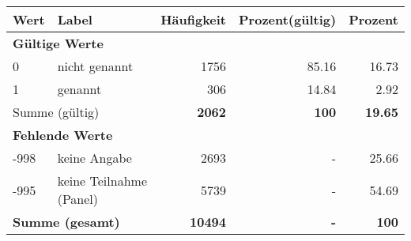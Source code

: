      \begin{longtable}{lXrrr}
     \toprule
     \textbf{Wert} & \textbf{Label} & \textbf{Häufigkeit} & \textbf{Prozent(gültig)} & \textbf{Prozent} \\
     \endhead
     \midrule
     \multicolumn{5}{l}{\textbf{Gültige Werte}}\\

     0 &
     \multicolumn{1}{X}{ nicht genannt   } &


       \num{1756} &
       \num[round-mode=places,round-precision=2]{85.16} &
         \num[round-mode=places,round-precision=2]{16.73} \\

     1 &
     \multicolumn{1}{X}{ genannt   } &


       \num{306} &
       \num[round-mode=places,round-precision=2]{14.84} &
         \num[round-mode=places,round-precision=2]{2.92} \\
     \midrule
     \multicolumn{2}{l}{Summe (gültig)} &
       \textbf{\num{2062}} &
     \textbf{\num{100}} &
       \textbf{\num[round-mode=places,round-precision=2]{19.65}} \\
     \multicolumn{5}{l}{\textbf{Fehlende Werte}}\\
       -998 &
       keine Angabe &
         \num{2693} &
        - &
         \num[round-mode=places,round-precision=2]{25.66} \\
       -995 &
       keine Teilnahme (Panel) &
         \num{5739} &
        - &
         \num[round-mode=places,round-precision=2]{54.69} \\
     \midrule
     \multicolumn{2}{l}{\textbf{Summe (gesamt)}} &
          \textbf{\num{10494}} &
        \textbf{-} &
        \textbf{\num{100}} \\
     \bottomrule
     \end{longtable}
     
